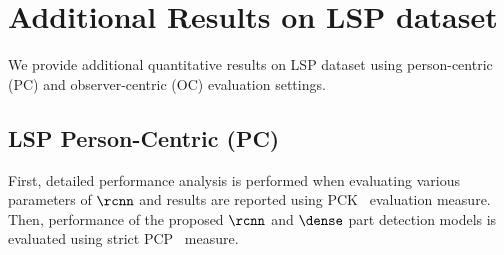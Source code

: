 \section{Additional Results on LSP dataset}
\label{seq:supplemental:lsp}
We provide additional quantitative results on LSP dataset using
person-centric (PC) and observer-centric (OC) evaluation settings.
\subsection{LSP Person-Centric (PC)}
First, detailed performance analysis is performed when evaluating
various parameters of $\rcnn$ and results are reported using
PCK~\cite{sapp13cvpr} evaluation
measure. Then, performance of the proposed $\rcnn$ and $\dense$ part
detection models is evaluated using strict PCP~\cite{Ferrari:2008:PSS}
measure.

